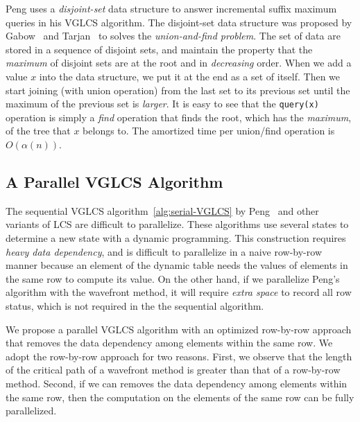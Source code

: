 Peng uses a {\em disjoint-set} data structure to answer incremental
suffix maximum queries in his VGLCS algorithm.  The disjoint-set data
structure was proposed by Gabow~\cite{Gabow1983ALA} and
Tarjan~\cite{Tarjan1975EfficiencyOA} to solves the {\em union-and-find
  problem}.  The set of data are stored in a sequence of disjoint
sets, and maintain the property that the {\em maximum} of disjoint
sets are at the root and in {\em decreasing} order.  When we add a
value $x$ into the data structure, we put it at the end as a set of
itself.  Then we start joining (with union operation) from the last
set to its previous set until the maximum of the previous set is {\em
  larger}.  It is easy to see that the {\tt query(x)} operation is
simply a {\em find} operation that finds the root, which has the {\em
  maximum}, of the tree that $x$ belongs to.  The amortized time per
union/find operation is $O(\alpha(n))$.

\subsection{A Parallel VGLCS Algorithm}

The sequential VGLCS algorithm~\ref{alg:serial-VGLCS} by
Peng~\cite{Peng2011TheLC} and other variants of LCS are difficult to
parallelize.  These algorithms use several states to determine a new
state with a dynamic programming.  This construction requires {\em
  heavy data dependency}, and is difficult to parallelize in a naive
row-by-row manner because an element of the dynamic table needs the
values of elements in the same row to compute its value.  On the other
hand, if we parallelize Peng's algorithm with the wavefront method, it
will require {\em extra space} to record all row status, %
which is not required in the the sequential algorithm.



We propose a parallel VGLCS algorithm with an optimized row-by-row
approach that removes the data dependency among elements within the
same row.  We adopt the row-by-row approach for two reasons.  First,
we observe that the length of the critical path of a wavefront method
is greater than that of a row-by-row method.  Second, if we can
removes the data dependency among elements within the same row, then
the computation on the elements of the same row can be fully
parallelized.

